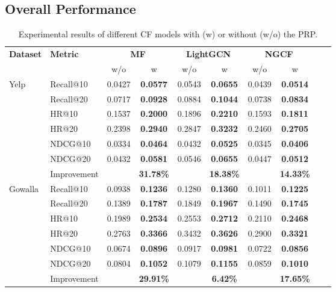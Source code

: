 \subsection{Overall Performance}
\begin{table}[t]
\caption{Experimental results of different CF models with (w) or without (w/o) the PRP.}
\centering
\begin{tabular}{@{}llcccccccc@{}}
\toprule
\multirow{2}{*}{\textbf{Dataset}} & \multirow{2}{*}{\textbf{Metric}} & \multicolumn{2}{c}{\textbf{MF}} & \multicolumn{2}{c}{\textbf{LightGCN}} & \multicolumn{2}{c}{\textbf{NGCF}} & 
\\ \cmidrule(l){3-9} 
 &  & w/o & w & w/o & w & w/o & w  \\ \midrule
\multirow{6}{*}{Yelp} 
 & Recall@10 & 0.0427 & \textbf{0.0577} & 0.0543 & \textbf{0.0655} & 0.0439 & \textbf{0.0514}  \\
 & Recall@20 & 0.0717 & \textbf{0.0928} & 0.0884 & \textbf{0.1044} & 0.0738 & \textbf{0.0834}   \\
 & HR@10 & 0.1537 & \textbf{0.2000} & 0.1896 & \textbf{0.2210} & 0.1593 & \textbf{0.1811}   \\
 & HR@20 & 0.2398 & \textbf{0.2940} & 0.2847 & \textbf{0.3232} & 0.2460 & \textbf{0.2705}  \\
 & NDCG@10 & 0.0334 & \textbf{0.0464} & 0.0432 & \textbf{0.0525} & 0.0345 & \textbf{0.0406}  \\
 & NDCG@20 & 0.0432 & \textbf{0.0581} & 0.0546 & \textbf{0.0655} & 0.0447 & \textbf{0.0512}   \\
\cmidrule(l){2-9} 
  & Improvement &  & \textbf{31.78\%} &  & \textbf{18.38\%} &  & \textbf{14.33\%} \\ \midrule 

\multirow{6}{*}{Gowalla} 
 & Recall@10 & 0.0938 & \textbf{0.1236} & 0.1280 & \textbf{0.1360} & 0.1011 & \textbf{0.1225}   \\
 & Recall@20 & 0.1389 & \textbf{0.1787} & 0.1849 & \textbf{0.1967} & 0.1490 & \textbf{0.1745}   \\
 & HR@10 & 0.1989 & \textbf{0.2534} &  0.2553 & \textbf{0.2712} & 0.2110 & \textbf{0.2468}  \\
 & HR@20 & 0.2763 & \textbf{0.3366} & 0.3432 & \textbf{0.3626} & 0.2900 & \textbf{0.3321}   \\
 & NDCG@10 & 0.0674 & \textbf{0.0896} & 0.0917 & \textbf{0.0981} & 0.0722 & \textbf{0.0856} \\
 & NDCG@20 & 0.0804 & \textbf{0.1052} & 0.1079 & \textbf{0.1155} & 0.0859 &  \textbf{0.1010}  \\
\cmidrule(l){2-9} 
  & Improvement &  & \textbf{29.91\%} &  & \textbf{6.42\%} &  & \textbf{17.65\%} \\ \midrule 
\end{tabular}
\label{tab:with}
\end{table}

